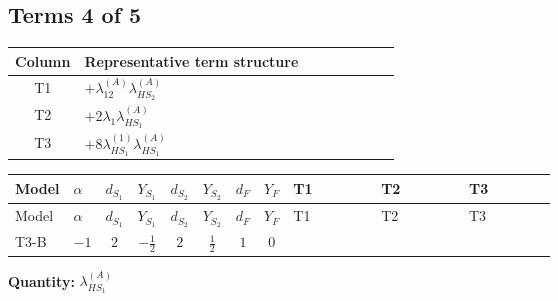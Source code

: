 \documentclass[8pt]{article}
\begin{document}
\begin{landscape}
\subsection*{Terms 4 of 5}
\begin{center}
\begin{tabular}{@{}c >{\raggedright\arraybackslash}p{0.82\linewidth}@{}}
\toprule
Column & Representative term structure \\
\midrule
T1 & \(\displaystyle +{\lambda_{12}^{(A)}} {\lambda_{HS_2}^{(A)}}\) \\
\midrule
T2 & \(\displaystyle +2 {\lambda_1} {\lambda_{HS_1}^{(A)}}\) \\
\midrule
T3 & \(\displaystyle +8 {\lambda_{HS_1}^{(1)}} {\lambda_{HS_1}^{(A)}}\) \\
\midrule
\bottomrule
\end{tabular}
\end{center}
\smallskip
\tiny
\begin{longtable}{@{}llcccccc >{\raggedright\arraybackslash}p{0.21\linewidth} >{\raggedright\arraybackslash}p{0.21\linewidth} >{\raggedright\arraybackslash}p{0.21\linewidth}@{}}
\toprule
Model & $\alpha$ & $d_{S_1}$ & $Y_{S_1}$ & $d_{S_2}$ & $Y_{S_2}$ & $d_F$ & $Y_F$ & T1 & T2 & T3 \\
\midrule
\endfirsthead
\toprule
Model & $\alpha$ & $d_{S_1}$ & $Y_{S_1}$ & $d_{S_2}$ & $Y_{S_2}$ & $d_F$ & $Y_F$ & T1 & T2 & T3 \\
\midrule
\endhead
T3-B & $-1$ & $2$ & $-\frac{1}{2}$ & $2$ & $\frac{1}{2}$ & $1$ & $0$ & \scriptsize\adjustbox{max width=\linewidth}{$\begin{gathered} +{\lambda_{12}^{(A)}} {\lambda_{HS_2}^{(A)}}\end{gathered}$} & \scriptsize\adjustbox{max width=\linewidth}{$\begin{gathered} +2 {\lambda_1} {\lambda_{HS_1}^{(A)}}\end{gathered}$} & \scriptsize\adjustbox{max width=\linewidth}{$\begin{gathered} +8 {\lambda_{HS_1}^{(1)}} {\lambda_{HS_1}^{(A)}}\end{gathered}$} \\
\midrule
\bottomrule
\end{longtable}
\clearpage
\noindent\textbf{Quantity: }$\lambda_{HS_1}^{(A)}$\par\smallskip

\end{landscape}
\end{document}
